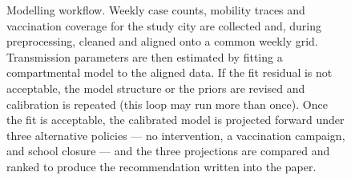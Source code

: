 \documentclass{article}
\begin{document}
\begin{figure}[htbp]
\caption{Modelling workflow. Weekly case counts, mobility traces and
vaccination coverage for the study city are collected and, during
preprocessing, cleaned and aligned onto a common weekly grid.
Transmission parameters are then estimated by fitting a compartmental
model to the aligned data. If the fit residual is not acceptable, the
model structure or the priors are revised and calibration is repeated
(this loop may run more than once). Once the fit is acceptable, the
calibrated model is projected forward under three alternative policies
--- no intervention, a vaccination campaign, and school closure --- and
the three projections are compared and ranked to produce the
recommendation written into the paper.}
\end{figure}
\end{document}
